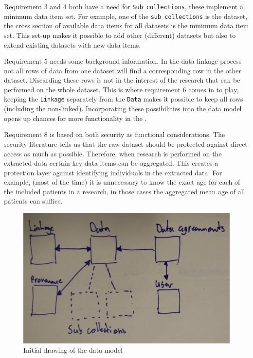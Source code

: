 Requirement 3 and 4 both have a need for {\tt Sub collections}, these implement a minimum data item set.
For example, one of the {\tt sub collections} is the \IVF{} dataset, the cross section of available data items for all \IVF{} datasets is the minimum data item set.
This set-up makes it possible to add other (different) datasets but also to extend existing datasets with new data items.

Requirement 5 needs some background information.
In the data linkage process not all rows of data from one dataset will find a corresponding row in the other dataset.
Discarding these rows is not in the interest of the research that can be performed on the whole dataset.
This is where requirement 6 comes in to play, keeping the {\tt Linkage} separately from the {\tt Data} makes it possible to keep all rows (including the non-linked).
Incorporating these possibilities into the data model opens up chances for more functionality in the \ivfsystem{}.

Requirement 8 is based on both security as functional considerations.
The security literature tells us that the raw dataset should be protected against direct access as much as possible.
Therefore, when research is performed on the extracted data certain key data items can be aggregated.
This creates a protection layer against identifying individuals in the extracted data.
For example, (most of the time) it is unnecessary to know the exact age for each of the included patients in a research, in those cases the aggregated mean age of all patients can suffice.

\begin{figure}[!b]
	\centering
	\includegraphics[width=1.0\linewidth]{images/small-structure-v2}
	\caption{Initial drawing of the data model} %
	\label{fig:model-drawing}
\end{figure}

